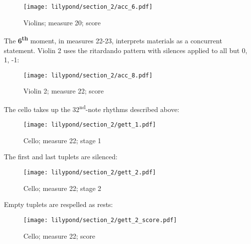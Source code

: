 
\setcounter{figure}{15}
\setcounter{subFigure}{0}
\renewcommand{\thefigure}{\thechapter.\arabic{figure}}
\begin{figure}[H]
    \texttt{[image: lilypond/section\_2/acc\_6.pdf]}
    \caption{Violins; measure 20; score}
    \label{fig:accelerando-6}
\end{figure}

The \textbf{6\textsuperscript{th}} moment, in measures 22-23, interprets materials  as a concurrent statement. Violin 2 uses the ritardando pattern with silences applied to all but 0, 1, -1:

\setcounter{figure}{16}
\begin{figure}[H]
    \texttt{[image: lilypond/section\_2/acc\_8.pdf]}
    \caption{Violin 2; measure 22; score}
    \label{fig:accelerando-8}
\end{figure}

The cello takes up the 32\textsuperscript{nd}-note rhythms described above:

\setcounter{figure}{17}
\setcounter{subFigure}{1}
\renewcommand{\thefigure}{\thechapter.\arabic{figure}.\alph{subFigure}}
\begin{figure}[H]
    \texttt{[image: lilypond/section\_2/gett\_1.pdf]}
    \caption{Cello; measure 22; stage 1}
    \label{fig:final-gett-1}
\end{figure}

The first and last tuplets are silenced:

\setcounter{figure}{17}
\setcounter{subFigure}{2}
\begin{figure}[H]
    \texttt{[image: lilypond/section\_2/gett\_2.pdf]}
    \caption{Cello; measure 22; stage 2}
    \label{fig:final-gett-2}
\end{figure}

Empty tuplets are respelled as rests:

\setcounter{figure}{17}
\setcounter{subFigure}{3}
\begin{figure}[H]
    \texttt{[image: lilypond/section\_2/gett\_2\_score.pdf]}
    \caption{Cello; measure 22; score}
    \label{fig:final-gett-2-score}
\end{figure}

